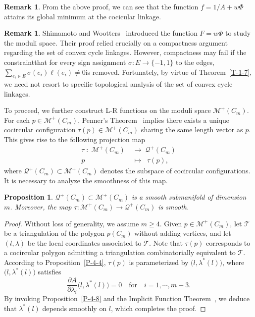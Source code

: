 \documentclass[11pt,letterpaper]{amsart}
\theoremstyle{plain}
\newtheorem{proposition}[theorem]{Proposition}
\theoremstyle{definition}
\newtheorem{remark}[theorem]{Remark}
\theoremstyle{remark}
\numberwithin{equation}{section}
\begin{document}
\begin{remark}\label{R-4-12}
From the above proof, we can see that the function $f=1/A+w\Phi$ attains its global minimum at the cocicular linkage.
\end{remark}



\begin{remark}\label{R-4-13}
Shimamoto and Wootters~\cite{Shimamoto-2014} introduced the function $F=w\Phi$ to study the moduli space. Their proof relied crucially on a compactness argument regarding the set of convex cycle linkages. However, compactness may fail if the constraint\textemdash that for every sign assignment $\sigma: E\to\{-1,1\}$ to the edges, $\sum_{e_i\in E}\sigma(e_i)\ell(e_i)\neq0$\textemdash is removed. Fortunately, by virtue of Theorem~\ref{T-1-7}, we need not resort to specific topological analysis of the set of convex cycle linkages.
\end{remark}


To proceed, we further construct L-R functions on the moduli space
$\mathcal M^{+}(C_m)$. For each $p\in \mathcal M^{+}(C_m)$, Penner's Theorem~\cite[Theorem 6.2]{Penner-1987} implies there exists a unique cocircular configuration
$\tau(p)\in \mathcal M^{+}(C_m)$ sharing the same length vector as $p$. This gives rise to the following projection map
\[
\begin{aligned}
\tau\;:\;\mathcal M^{+}(C_m)\;&\longrightarrow\;\mathcal Q^{+}(C_m)\\
p\;\;\;\,&\longmapsto\;\;\tau(p),
\end{aligned}
\]
where $\mathcal Q^{+}(C_m)\subset\mathcal M^{+}(C_m)$ denotes the subspace of cocircular configurations. It is necessary to analyze the smoothness of this map.

\begin{proposition}\label{P-4-14}
$\mathcal Q^{+}(C_m)\subset\mathcal M^{+}(C_m)$ is a smooth submanifold of dimension $m$. Moreover, the map $\tau:\mathcal M^{+}(C_m)\to\mathcal Q^{+}(C_m)$ is smooth.
\end{proposition}

\begin{proof}
Without loss of generality, we assume $m\geq 4$. Given $p\in\mathcal M^{+}(C_m)$, let $\mathcal T$ be a triangulation of the polygon $p(C_m)$ without adding vertices, and let $(l,\lambda)$ be the local coordinates associated to
$\mathcal T$. Note that $\tau(p)$ corresponds to a cocircular polygon admitting a triangulation combinatorially equivalent to
 $\mathcal T$. According to Proposition~\ref{P-4-4}, $\tau(p)$ is parameterized by $\big(l,\lambda^\ast(l)\big)$, where $\big(l,\lambda^\ast(l)\big)$ satisfies
\[
\frac{\partial A}{\partial \lambda_i}\big(l,\lambda^\ast(l)\big)=0\quad\text{for}\quad i=1,\cdots,m-3.
\]
By invoking Proposition~\ref{P-4-8} and the Implicit Function Theorem~\cite{Lee-2018}, we deduce that $\lambda^\ast(l)$ depends smoothly on $l$, which completes the proof.
\end{proof}
\end{document}
